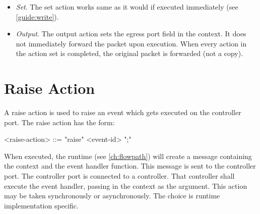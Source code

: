 \begin{itemize}
\item \textit{Set}. The set action works same as it would if executed immediately (see \ref{guide:write}). 

\item \textit{Output}. The output action sets the egress port field in the context. It does not immediately forward the packet upon execution. When every action in the action set is completed, the original packet is forwarded (not a copy).
\end{itemize}

\section{Raise Action} \label{guide:raise}

A raise action is used to raise an event which gets executed on the controller port. The raise action has the form:

\begin{minip}
\begin{grammar}
<raise-action> ::= "raise" <event-id> ";"
\end{grammar}
\end{minip}

When executed, the runtime (see \ref{ch:flowpath}) will create a message containing the context and the event handler function. This message is sent to the controller port. The controller port is connected to a controller. That controller shall execute the event handler, passing in the context as the argument. This action may be taken synchronously or asynchronously. The choice is runtime implementation specific.

